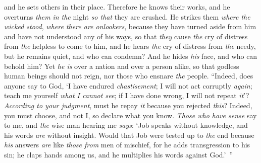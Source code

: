 \begin{biblechapter}
and he sets others in their place.
\verse Therefore he knows their works, 
and he overturns \textit{them} \textit{in the} night 
\textit{so that} they are crushed.
\verse He strikes them \textit{where the wicked stood}, 
\textit{where there are onlookers},
\verse because they have turned aside from him 
and have not understood any of his ways,
\verse so that \textit{they} cause \textit{the} cry of distress from \textit{the} helpless to come to him, 
and he hears \textit{the} cry of distress from \textit{the} needy,
\verse but he remains quiet, and who can condemn? 
And he hides \textit{his} face, and who can behold him? 
Yet \textit{he is} over a nation and over a person alike,
\verse so that godless human beings should not reign, 
nor those who ensnare \textit{the} people.
\verse “Indeed, does anyone say to God, ‘I have endured \textit{chastisement}; 
I will not act corruptly \textit{again};
\verse teach me yourself \textit{what I cannot see}; 
if I have done wrong, I will not repeat \textit{it}’?
\verse \textit{According to your judgment}, must he repay \textit{it} because you rejected \textit{this}? 
Indeed, you must choose, and not I, so declare what you know.
\verse \textit{Those who have sense} say to me, 
and \textit{the} wise man hearing me \textit{says}:
\verse ‘Job speaks without knowledge, 
and his words \textit{are} without insight.
\verse Would that Job were tested up to \textit{the} end 
because \textit{his} answers \textit{are} like \textit{those from} men of mischief,
\verse for he adds transgression to his sin; 
he claps hands among us, 
and he multiplies his words against God.’ ”
\end{biblechapter}

